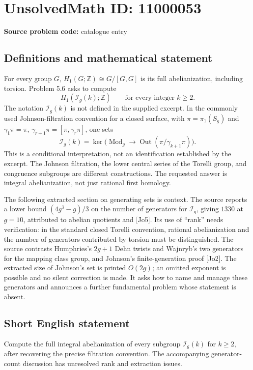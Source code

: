 \documentclass[11pt]{article}
\newcommand{\Z}{\mathbb{Z}}
\begin{document}
\section*{UnsolvedMath ID: 11000053}
\textbf{Source problem code:} catalogue entry
\subsection{Definitions and mathematical statement}
For every group $G$, $H_1(G;\Z)\cong G/[G,G]$ is its full abelianization, including torsion. Problem 5.6 asks to compute
\[
 H_1(\mathcal I_g(k);\Z)\qquad\text{for every integer }k\geq2.
\]
The notation $\mathcal I_g(k)$ is not defined in the supplied excerpt. In the commonly used Johnson-filtration convention for a closed surface, with $\pi=\pi_1(S_g)$ and $\gamma_1\pi=\pi$, $\gamma_{r+1}\pi=[\pi,\gamma_r\pi]$, one sets
\[
 \mathcal I_g(k)=\ker\bigl(\operatorname{Mod}_g\to
 \operatorname{Out}(\pi/\gamma_{k+1}\pi)\bigr).
\]
This is a conditional interpretation, not an identification established by the excerpt. The Johnson filtration, the lower central series of the Torelli group, and congruence subgroups are different constructions. The requested answer is integral abelianization, not just rational first homology.

The following extracted section on generating sets is context. The source reports a lower bound $(4g^3-g)/3$ on the number of generators for $\mathcal I_g$, giving $1330$ at $g=10$, attributed to abelian quotients and [Jo5]. Its use of ``rank'' needs verification: in the standard closed Torelli convention, rational abelianization and the number of generators contributed by torsion must be distinguished. The source contrasts Humphries's $2g+1$ Dehn twists and Wajnryb's two generators for the mapping class group, and Johnson's finite-generation proof [Jo2]. The extracted size of Johnson's set is printed $O(2g)$; an omitted exponent is possible and no silent correction is made. It asks how to name and manage these generators and announces a further fundamental problem whose statement is absent.
\subsection{Short English statement}
Compute the full integral abelianization of every subgroup $\mathcal I_g(k)$ for $k\geq2$, after recovering the precise filtration convention. The accompanying generator-count discussion has unresolved rank and extraction issues.
\end{document}

